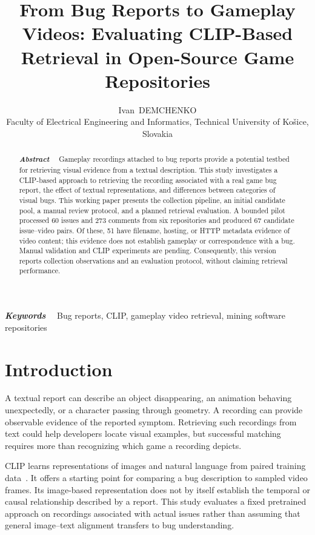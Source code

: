\documentclass[journal,a4paper,onecolumn]{IEEEtran}
\begin{document}
\addtocounter{page}{1}
\title{From Bug Reports to Gameplay Videos: Evaluating CLIP-Based Retrieval in Open-Source Game Repositories}
\author{Ivan~DEMCHENKO\\Faculty of Electrical Engineering and Informatics, Technical University of Ko\v{s}ice, Slovakia}
\maketitle
\begin{abstract}
\textbf{\textit{Abstract}}~\textendash~
Gameplay recordings attached to bug reports provide a potential testbed for retrieving visual evidence from a textual description. This study investigates a CLIP-based approach to retrieving the recording associated with a real game bug report, the effect of textual representations, and differences between categories of visual bugs. This working paper presents the collection pipeline, an initial candidate pool, a manual review protocol, and a planned retrieval evaluation. A bounded pilot processed 60 issues and 273 comments from six repositories and produced 67 candidate issue--video pairs. Of these, 51 have filename, hosting, or HTTP metadata evidence of video content; this evidence does not establish gameplay or correspondence with a bug. Manual validation and CLIP experiments are pending. Consequently, this version reports collection observations and an evaluation protocol, without claiming retrieval performance.
\end{abstract}
\begin{IEEEkeywords}
\textbf{\textit{Keywords}}~\textendash~
Bug reports, CLIP, gameplay video retrieval, mining software repositories
\end{IEEEkeywords}

\section{Introduction}
A textual report can describe an object disappearing, an animation behaving unexpectedly, or a character passing through geometry. A recording can provide observable evidence of the reported symptom. Retrieving such recordings from text could help developers locate visual examples, but successful matching requires more than recognizing which game a recording depicts.

CLIP learns representations of images and natural language from paired training data~\cite{radford2021}. It offers a starting point for comparing a bug description to sampled video frames. Its image-based representation does not by itself establish the temporal or causal relationship described by a report. This study evaluates a fixed pretrained approach on recordings associated with actual issues rather than assuming that general image--text alignment transfers to bug understanding.
\end{document}
